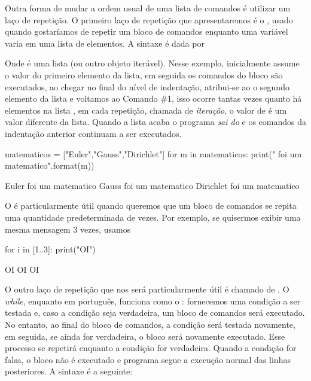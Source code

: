 Outra forma de mudar a ordem usual de uma lista de comandos é
utilizar um laço de repetição. O primeiro laço de repetição
que apresentaremos é o , usado quando
gostaríamos de repetir um bloco de comandos enquanto uma variável
varia em uma lista de elementos. A sintaxe é dada por
\noindent Onde  é uma lista (ou outro objeto iterável). Nesse exemplo,
inicialmente  assume o valor do primeiro elemento da lista,
em seguida os comandos do bloco são executados, ao chegar no final
do nível de indentação, atribui-se ao  o segundo elemento da lista
e voltamos ao Comando \#1, isso ocorre tantas vezes quanto há elementos
na lista , em cada repetição, chamada de \emph{iteração}, o valor
de  é um valor diferente da lista. Quando a lista acaba o 
programa \emph{sai do } e os comandos da indentação
anterior continuam a ser  executados. 
\begin{sageinput}
matematicos = ["Euler","Gauss","Dirichlet"]
for m in matematicos:
  print("{} foi um matematico".format(m))
\end{sageinput}
\begin{sageoutput}
Euler foi um matematico
Gauss foi um matematico
Dirichlet foi um matematico
\end{sageoutput}

O  é particularmente
útil quando queremos que um bloco de comandos se repita uma quantidade
predeterminada de vezes. Por exemplo, se quisermos exibir uma mesma mensagem
3 vezes, usamos
\begin{sageinput}
for i in [1..3]:
  print("OI")
\end{sageinput}
\begin{sageoutput}
OI
OI
OI
\end{sageoutput}

O outro laço de repetição que nos será particularmente útil é chamado
de . O \emph{while}, enquanto em português, funciona
como o : fornecemos uma condição a ser testada e, caso 
a condição seja verdadeira, um bloco de comandos será
executado. No entanto, ao final do bloco de comandos, 
a condição será testada novamente, em seguida, se ainda for
verdadeira, o bloco será novamente executado. Esse processo
se repetirá enquanto a condição for verdadeira. Quando a 
condição for falsa, o bloco não é executado e programa
segue a execução normal das linhas posteriores. 
A sintaxe é a seguinte:


